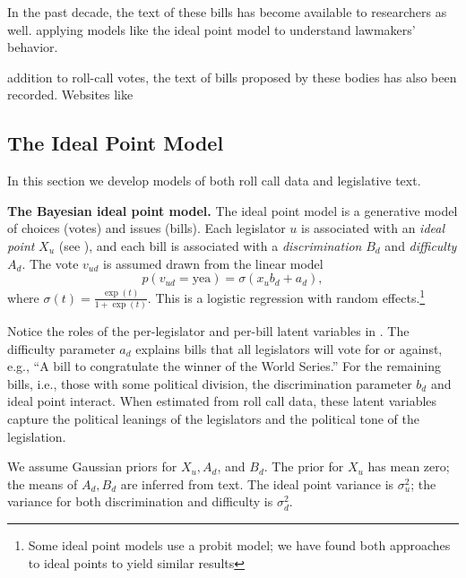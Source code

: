 In the past decade, the text of these bills has become available to researchers as well.  applying models like the ideal point
model to understand lawmakers' behavior.

addition to roll-call votes, the text of bills proposed by these bodies has also been recorded.  Websites like 

\subsection{The Ideal Point Model}

\label{sec:model}
In this section we develop models of both roll call data and
legislative text.

\textbf{The Bayesian ideal point model.}
The ideal point model is a generative model of choices (votes) and
issues (bills).  Each legislator $u$ is associated with an
\textit{ideal point} $X_u$ (see ), and each bill
is associated with a \textit{discrimination} $B_d$ and
\textit{difficulty} $A_d$.  The vote $v_{ud}$ is assumed drawn from the
linear model
\begin{equation}
  \label{eq:ideal-point}
  p(v_{ud} = \textrm{yea}) = \sigma(x_u b_d + a_d),
\end{equation}
where $\sigma(t) = \frac{\exp(t)}{1 + \exp(t)}$.  This is a logistic
regression with random effects.\footnote{Some ideal point models use a
probit model; we have found both approaches to ideal points to yield
similar results}

Notice the roles of the per-legislator and per-bill latent variables
in .  The difficulty parameter $a_d$ explains bills
that all legislators will vote for or against, e.g., ``A bill to
congratulate the winner of the World Series.''  For the remaining
bills, i.e., those with some political division, the discrimination
parameter $b_d$ and ideal point interact.  When estimated from roll
call data, these latent variables capture the political leanings of
the legislators and the political tone of the legislation.

We assume Gaussian priors for $X_u, A_d$, and $B_d$.  The prior for
$X_u$ has mean zero; the means of $A_d, B_d$ are inferred from text.
The ideal point variance is $\sigma_u^2$; the variance for both
discrimination and difficulty is $\sigma_d^2$.

